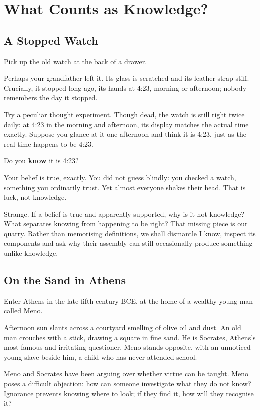 \chapter{What Counts as Knowledge?}
\section{A Stopped Watch}
Pick up the old watch at the back of a drawer.

Perhaps your grandfather left it. Its glass is scratched and its leather strap stiff. Crucially, it stopped long ago, its hands at 4:23, morning or afternoon; nobody remembers the day it stopped.

Try a peculiar thought experiment. Though dead, the watch is still right twice daily: at 4:23 in the morning and afternoon, its display matches the actual time exactly. Suppose you glance at it one afternoon and think it is 4:23, just as the real time happens to be 4:23.

Do you \textbf{know} it is 4:23?

Your belief is true, exactly. You did not guess blindly: you checked a watch, something you ordinarily trust. Yet almost everyone shakes their head. That is luck, not knowledge.

Strange. If a belief is true and apparently supported, why is it not knowledge? What separates knowing from happening to be right? That missing piece is our quarry. Rather than memorising definitions, we shall dismantle I know, inspect its components and ask why their assembly can still occasionally produce something unlike knowledge.

\section{On the Sand in Athens}
Enter Athens in the late fifth century BCE, at the home of a wealthy young man called Meno.

Afternoon sun slants across a courtyard smelling of olive oil and dust. An old man crouches with a stick, drawing a square in fine sand. He is Socrates, Athens's most famous and irritating questioner. Meno stands opposite, with an unnoticed young slave beside him, a child who has never attended school.

Meno and Socrates have been arguing over whether virtue can be taught. Meno poses a difficult objection: how can someone investigate what they do not know? Ignorance prevents knowing where to look; if they find it, how will they recognise it?

